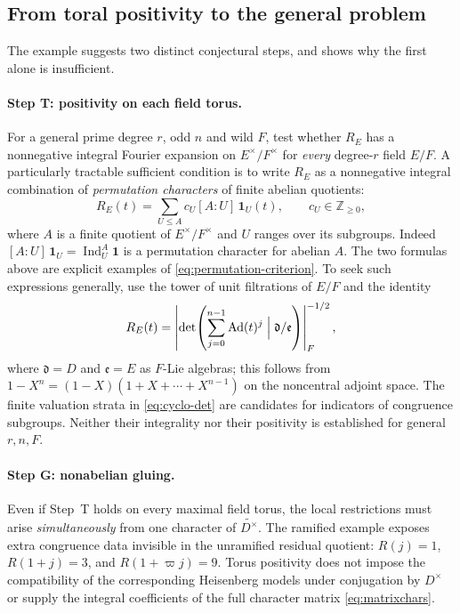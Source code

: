 \documentclass[11pt]{article}
\theoremstyle{plain}
\theoremstyle{definition}
\begin{document}
\subsection{From toral positivity to the general problem}
\label{subsec:strategywild}
The example suggests two distinct conjectural steps, and shows
why the first alone is insufficient.

\paragraph{Step T: positivity on each field torus.}
For a general prime degree $r$, odd $n$ and wild $F$, test
whether $R_E$ has a nonnegative integral Fourier expansion
on $E^\times/F^\times$ for \emph{every} degree-$r$ field
$E/F$.  A particularly tractable sufficient condition is to
write $R_E$ as a nonnegative integral combination of
\emph{permutation characters} of finite abelian quotients:
\begin{equation}\label{eq:permutation-criterion}
 R_E(t)=\sum_{U\leq A}c_U[A:U]\,\mathbf1_U(t),
 \qquad c_U\in\mathbb Z_{\geq0},
\end{equation}
where $A$ is a finite quotient of $E^\times/F^\times$ and
$U$ ranges over its subgroups.  Indeed
$[A:U]\,\mathbf1_U=\operatorname{Ind}_U^A\mathbf1$ is a
permutation character for abelian $A$.  The two formulas above
are explicit examples of \eqref{eq:permutation-criterion}.
To seek such expressions generally, use the tower of unit
filtrations of $E/F$ and the identity
\begin{equation}\label{eq:cyclo-det}
 R_E(t)=\left|
 \det\!\left(\sum_{j=0}^{n-1}\operatorname{Ad}(t)^j
 \Bigm|\mathfrak d/\mathfrak e\right)
 \right|_F^{-1/2},
\end{equation}
where $\mathfrak d=D$ and $\mathfrak e=E$ as $F$-Lie
algebras; this follows from
$1-X^n=(1-X)(1+X+\cdots+X^{n-1})$
on the noncentral adjoint space.  The finite valuation strata
in \eqref{eq:cyclo-det} are candidates for indicators of
congruence subgroups.  Neither their integrality nor their
positivity is established for general $r,n,F$.

\paragraph{Step G: nonabelian gluing.}
Even if Step~T holds on every maximal field torus, the local
restrictions must arise \emph{simultaneously} from one character
of $\widetilde{D^\times}$.  The ramified example exposes extra
congruence data invisible in the unramified residual quotient:
$R(j)=1$, $R(1+j)=3$, and $R(1+\varpi j)=9$.
Torus positivity does not impose the compatibility of the
corresponding Heisenberg models under conjugation by
$D^\times$ or supply the integral coefficients of the full
character matrix \eqref{eq:matrixchars}.
\end{document}
